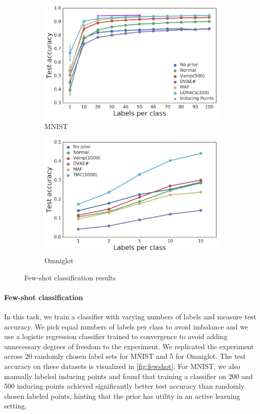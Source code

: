 \begin{figure}[t]
\centering
\begin{subfigure}[t]{0.35\textwidth}
    \centering
    \includegraphics[width=\textwidth]{img/loracs/mnist/cf-mnist.png}
    \caption{MNIST}
\end{subfigure}
\begin{subfigure}[t]{0.33\textwidth}
    \centering
    \includegraphics[width=\textwidth]{img/loracs/omniglot/cf-omniglot.png}
    \caption{Omniglot}
\end{subfigure}
\caption{Few-shot classification results}
\vspace{-0.5cm}
\label{fig:fewshot}
\end{figure}
\paragraph{Few-shot classification}
In this task,
we train a
classifier with
varying numbers of labels and measure
test accuracy. We pick
equal numbers of labels per class
to avoid imbalance and we use
a logistic regression classifier
trained to convergence to avoid
adding unnecessary degrees of freedom to the experiment.
We replicated the experiment across
20 randomly chosen label sets for MNIST
and 5 for Omniglot.
The test accuracy on
these datasets is visualized in 
\autoref{fig:fewshot}. For MNIST, we 
also manually labeled inducing points and
found that training a classifier on 200 and 500 inducing points
achieved significantly better test accuracy than 
randomly chosen labeled points, hinting that
the \acronym\;prior has utility in an active learning setting.

